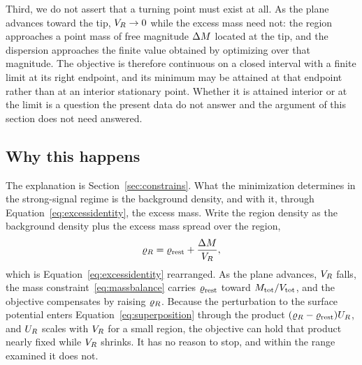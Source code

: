 Third, we do not assert that a turning point must exist at all. As the plane
advances toward the tip, $V_{R} \to 0$ while the excess mass need not: the
region approaches a point mass of free magnitude $\Delta M$ located at the
tip, and the dispersion approaches the finite value obtained by optimizing
over that magnitude. The objective is therefore continuous on a closed
interval with a finite limit at its right endpoint, and its minimum may be
attained at that endpoint rather than at an interior stationary point.
Whether it is attained interior or at the limit is a question the present
data do not answer and the argument of this section does not need answered.

\subsection{Why this happens}
\label{sec:plane:why}

The explanation is Section~\ref{sec:constrains}. What the minimization
determines in the strong-signal regime is the background density, and with
it, through Equation~\eqref{eq:excessidentity}, the excess mass. Write the
region density as the background density plus the excess mass spread over
the region,
%
\begin{equation}
\varrho_{R} = \varrho_{\mathrm{rest}} + \frac{\Delta M}{V_{R}} ,
\label{eq:plane:decompose}
\end{equation}
%
which is Equation~\eqref{eq:excessidentity} rearranged. As the plane
advances, $V_{R}$ falls, the mass constraint~\eqref{eq:massbalance} carries
$\varrho_{\mathrm{rest}}$ toward $M_{\mathrm{tot}}/V_{\mathrm{tot}}$, and the objective compensates by raising
$\varrho_{R}$. Because the perturbation to the surface potential enters
Equation~\eqref{eq:superposition} through the product
$(\varrho_{R}-\varrho_{\mathrm{rest}})U_{R}$, and $U_{R}$ scales with $V_{R}$ for a small region, the
objective can hold that product nearly fixed while $V_{R}$ shrinks. It has no
reason to stop, and within the range examined it does not.

